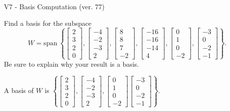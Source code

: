 \begin{exercise}
  \begin{exerciseTitle}V7 - Basis Computation (ver. 77)\end{exerciseTitle}
  \begin{exerciseStatement}
    Find a basis for the subspace 
\[W=\mathrm{span}\ \left\{\left[\begin{array}{r}
2 \\
3 \\
2 \\
0
\end{array}\right] , \left[\begin{array}{r}
-4 \\
-2 \\
-3 \\
2
\end{array}\right] , \left[\begin{array}{r}
8 \\
8 \\
7 \\
-2
\end{array}\right] , \left[\begin{array}{r}
-16 \\
-16 \\
-14 \\
4
\end{array}\right] , \left[\begin{array}{r}
0 \\
1 \\
0 \\
-2
\end{array}\right] , \left[\begin{array}{r}
-3 \\
0 \\
-2 \\
-1
\end{array}\right]\right\}.\]
 Be sure to explain why your result is a basis.


  \end{exerciseStatement}
  \begin{exerciseAnswer}
   A basis of \(W\) is  \(\left\{\left[\begin{array}{r}
2 \\
3 \\
2 \\
0
\end{array}\right] , \left[\begin{array}{r}
-4 \\
-2 \\
-3 \\
2
\end{array}\right] , \left[\begin{array}{r}
0 \\
1 \\
0 \\
-2
\end{array}\right] \left[\begin{array}{r}
-3 \\
0 \\
-2 \\
-1
\end{array}\right]\right\}\).
  


  \end{exerciseAnswer}
\end{exercise}